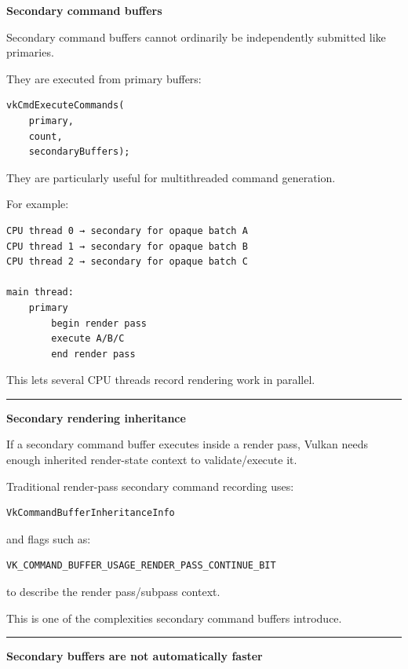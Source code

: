 \textbf{Secondary command buffers}

Secondary command buffers cannot ordinarily be independently submitted like primaries.

They are executed from primary buffers:

\begin{verbatim}
vkCmdExecuteCommands(
    primary,
    count,
    secondaryBuffers);
\end{verbatim}

They are particularly useful for multithreaded command generation.

For example:

\begin{verbatim}
CPU thread 0 → secondary for opaque batch A
CPU thread 1 → secondary for opaque batch B
CPU thread 2 → secondary for opaque batch C

main thread:
    primary
        begin render pass
        execute A/B/C
        end render pass
\end{verbatim}

This lets several CPU threads record rendering work in parallel.

\begin{center}\rule{0.5\linewidth}{0.5pt}\end{center}

\textbf{Secondary rendering inheritance}

If a secondary command buffer executes inside a render pass, Vulkan needs enough inherited render-state context to validate/execute it.

Traditional render-pass secondary command recording uses:

\begin{verbatim}
VkCommandBufferInheritanceInfo
\end{verbatim}

and flags such as:

\begin{verbatim}
VK_COMMAND_BUFFER_USAGE_RENDER_PASS_CONTINUE_BIT
\end{verbatim}

to describe the render pass/subpass context.

This is one of the complexities secondary command buffers introduce.

\begin{center}\rule{0.5\linewidth}{0.5pt}\end{center}

\textbf{Secondary buffers are not automatically faster}


